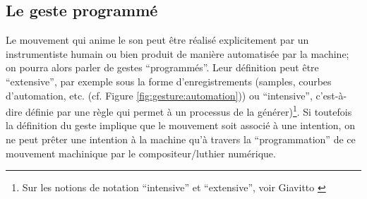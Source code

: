 \subsection{Le geste programmé}
\label{sec:gesture:instrumental_to_musical:geste_programme}

\noindent Le mouvement qui anime le son peut être réalisé explicitement par un instrumentiste humain ou bien produit de manière automatisée par la machine; on pourra alors parler de gestes ``programmés''. Leur définition peut être ``extensive'', par exemple sous la forme d'enregistrements (samples, courbes d'automation, etc. (cf. Figure \ref{fig:gesture:automation})) ou ``intensive'', c'est-à-dire définie par une règle qui permet à un processus de la générer)\footnote{Sur les notions de notation ``intensive'' et ``extensive'', voir Giavitto \cite{giavitto_du_2014}}. Si toutefois la définition du geste implique que le mouvement soit associé à une intention, on ne peut prêter une intention à la machine qu'à travers la ``programmation'' de ce mouvement machinique par le compositeur/luthier numérique.
